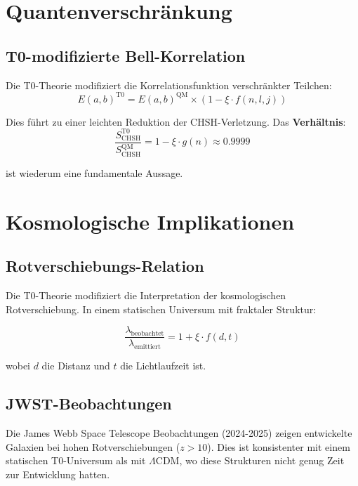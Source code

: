 \section{Quantenverschränkung}

\subsection{T0-modifizierte Bell-Korrelation}

Die T0-Theorie modifiziert die Korrelationsfunktion verschränkter Teilchen:
\begin{equation}
	E(a,b)^{\text{T0}} = E(a,b)^{\text{QM}} \times \left(1 - \xi \cdot f(n,l,j)\right)
\end{equation}

Dies führt zu einer leichten Reduktion der CHSH-Verletzung. Das \textbf{Verhältnis}:
\begin{equation}
	\frac{S_{\text{CHSH}}^{\text{T0}}}{S_{\text{CHSH}}^{\text{QM}}} = 1 - \xi \cdot g(n) 
	\approx 0.9999
\end{equation}

ist wiederum eine fundamentale Aussage.

\section{Kosmologische Implikationen}

\subsection{Rotverschiebungs-Relation}

Die T0-Theorie modifiziert die Interpretation der kosmologischen Rotverschiebung. 
In einem statischen Universum mit fraktaler Struktur:

\begin{equation}
	\frac{\lambda_{\text{beobachtet}}}{\lambda_{\text{emittiert}}} = 1 + \xi \cdot f(d,t)
\end{equation}

wobei $d$ die Distanz und $t$ die Lichtlaufzeit ist.

\subsection{JWST-Beobachtungen}

Die James Webb Space Telescope Beobachtungen (2024-2025) zeigen entwickelte 
Galaxien bei hohen Rotverschiebungen ($z > 10$). Dies ist konsistenter mit einem 
statischen T0-Universum als mit $\Lambda$CDM, wo diese Strukturen nicht genug 
Zeit zur Entwicklung hatten.

